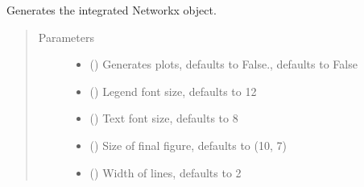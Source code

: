 \documentclass[letterpaper,10pt,english]{sphinxmanual}
\begin{document}
\begin{fulllineitems}
\begin{fulllineitems}
\label{\detokenize{apidoc:dreaminsg_integrated_model.src.network_sim_models.integrated_network.IntegratedNetwork.generate_integrated_graph}}
\sphinxAtStartPar
Generates the integrated Networkx object.
\begin{quote}\begin{description}
\item[{Parameters}] \leavevmode\begin{itemize}
\item {} 
\sphinxAtStartPar
{} (\sphinxstyleliteralemphasis{\sphinxupquote{, }}) \textendash{} Generates plots, defaults to False., defaults to False

\item {} 
\sphinxAtStartPar
{} (\sphinxstyleliteralemphasis{\sphinxupquote{, }}) \textendash{} Legend font size, defaults to 12

\item {} 
\sphinxAtStartPar
{} (\sphinxstyleliteralemphasis{\sphinxupquote{, }}) \textendash{} Text font size, defaults to 8

\item {} 
\sphinxAtStartPar
{} (\sphinxstyleliteralemphasis{\sphinxupquote{, }}) \textendash{} Size of final figure, defaults to (10, 7)

\item {} 
\sphinxAtStartPar
{} (\sphinxstyleliteralemphasis{\sphinxupquote{, }}) \textendash{} Width of lines, defaults to 2


\end{itemize}
\end{description}
\end{quote}
\end{fulllineitems}
\end{fulllineitems}
\end{document}
